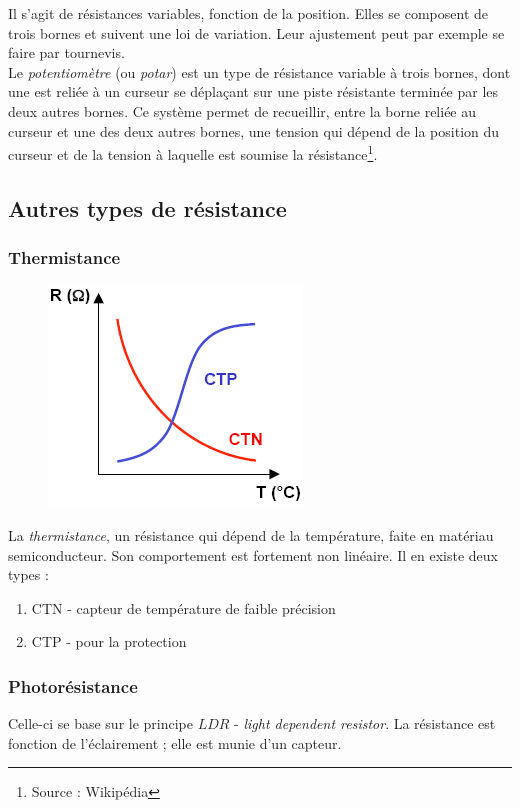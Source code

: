 \documentclass	[11pt, a4paper, openany]{book}
\begin{document}
Il s'agit de résistances variables, fonction de la position. Elles se composent de trois bornes et suivent une loi de variation. Leur ajustement peut par exemple se faire par tournevis.\\

Le \textit{potentiomètre} (ou \textit{potar}) est un type de résistance variable à trois bornes, dont une est reliée à un curseur se déplaçant sur une piste résistante terminée par les deux autres bornes. Ce système permet de recueillir, entre la borne reliée au curseur et une des deux autres bornes, une tension qui dépend de la position du curseur et de la tension à laquelle est soumise la résistance\footnote{Source : Wikipédia}.

\subsection{Autres types de résistance}
\subsubsection{Thermistance}
\begin{figure}
\includegraphics[scale=0.3]{img/image32}
\end{figure}
La \textit{thermistance}, un résistance qui dépend de la température, faite en matériau semiconducteur. Son comportement est fortement non linéaire. Il en existe deux types :
\begin{enumerate}
\item CTN - capteur de température de faible précision
\item CTP - pour la protection
\end{enumerate}%

\subsubsection{Photorésistance}
Celle-ci se base sur le principe $LDR$ - \textit{light dependent resistor}. La résistance est fonction de l'éclairement ; elle est munie d'un capteur. 
\end{document}
